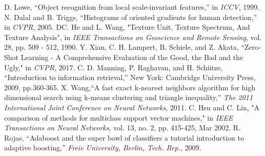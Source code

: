 \documentclass[conference]{IEEEtran}
\begin{document}
\begin{thebibliography}{00}
D. Lowe, “Object recognition from local scale-invariant features,” in \emph{ICCV}, 1999.
 N. Dalal and B. Triggs, ``Histograms of oriented gradients for human detection,'' in \emph{CVPR}, 2005.
 DC. He and L. Wang, "Texture Unit, Texture Spectrum, And Texture Analysis", in \emph{IEEE Transactions on Geoscience and Remote Sensing}, vol. 28, pp. 509 - 512, 1990.
  Y. Xian, C. H. Lampert, B. Schiele, and Z. Akata, ``Zero-Shot Learning - A Comprehensive Evaluation of the Good, the Bad and the Ugly," in \emph{CVPR}, 2017.
 C. D. Manning, P. Raghavan, and H. Schütze, ``Introduction to information retrieval,'' New York: Cambridge University Press, 2009, pp.360-365.
 X. Wang,``A fast exact k-nearest neighbors algorithm for high dimensional search using k-means clustering and triangle inequality,'' \emph{The 2011 International Joint Conference on Neural Networks}, 2011.
 C. Hsu and C. Lin, "A comparison of methods for multiclass support vector machines," in \emph{IEEE Transactions on Neural Networks}, vol. 13, no. 2, pp. 415-425, Mar 2002.
 R. Rojas, ``Adaboost and the super bowl of classifiers a tutorial introduction to adaptive boosting,'' \emph{Freie University, Berlin, Tech. Rep.}, 2009.
\end{thebibliography}
\end{document}

